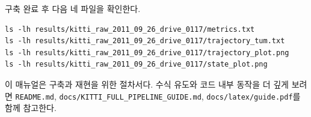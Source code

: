 \documentclass[11pt,a4paper,oneside]{report}
\begin{document}
구축 완료 후 다음 네 파일을 확인한다.

\begin{lstlisting}[style=shell]
ls -lh results/kitti_raw_2011_09_26_drive_0117/metrics.txt
ls -lh results/kitti_raw_2011_09_26_drive_0117/trajectory_tum.txt
ls -lh results/kitti_raw_2011_09_26_drive_0117/trajectory_plot.png
ls -lh results/kitti_raw_2011_09_26_drive_0117/state_plot.png
\end{lstlisting}

\begin{infobox}
이 매뉴얼은 구축과 재현을 위한 절차서다. 수식 유도와 코드 내부 동작을 더 깊게 보려면
\texttt{README.md}, \texttt{docs/KITTI\_FULL\_PIPELINE\_GUIDE.md},
\texttt{docs/latex/guide.pdf}를 함께 참고한다.
\end{infobox}
\end{document}
